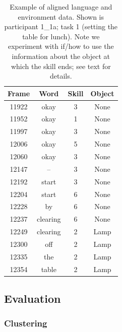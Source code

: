 \documentclass[11pt]{article}
\begin{document}
\begin{table}[ht!]
\centering
\begin{tabular}{|cccc|}
\hline
Frame & Word & Skill & Object  \\\hline
11922   & okay  &  3 &      None\\
11952   & okay   & 1  &     None\\
11997   & okay  &  3   &    None\\
12006   & okay  &  5   &    None\\
12060   & okay  &  3   &    None\\
12147   & --      &3   &    None\\
12192   & start   &3     &  None\\
12204   & start   &6     &  None\\
12228   & by      &6     &  None\\
12237   &clearing    &    6    &   None\\
12249   &clearing  &      2    &   Lamp\\
12300   &off     &2      & Lamp\\
12335   &the     &2      & Lamp\\
12354   &table  & 2     &  Lamp\\
\hline
\end{tabular}
\caption{Example of aligned language and environment data. Shown is participant 1\_1a; task 1 (setting the table for lunch). Note we experiment with if/how to use the information about the object at which the skill ends; see text for details.}
\label{tab:aligned}
\end{table}


\subsection{Evaluation}

\subsubsection{Clustering}
\end{document}
